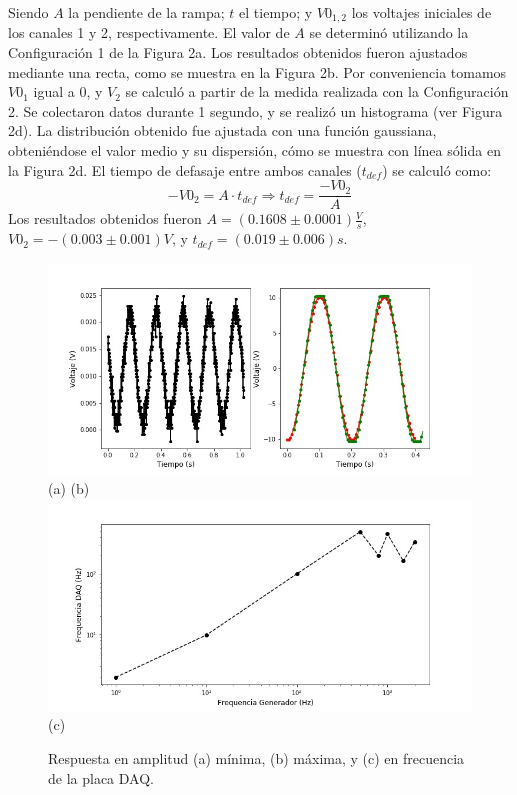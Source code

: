 \documentclass[a4paper,10pt]{article}
\begin{document}
Siendo $A$ la pendiente de la rampa; $t$ el tiempo; y $V0_{1,2}$ los voltajes iniciales de los canales 1 y 2, respectivamente.
El valor de $A$ se determinó utilizando la Configuración 1 de la Figura 2a. Los resultados obtenidos fueron ajustados mediante una recta, como se muestra en la Figura 2b. Por conveniencia tomamos $V0_1$ igual a $0$, y $V_2$ se calculó a partir de la medida realizada con la Configuración 2. Se colectaron datos durante 1 segundo, y se realizó un histograma (ver Figura 2d). La distribución obtenido fue ajustada con una función gaussiana, obteniéndose el valor medio y su dispersión, cómo se muestra con línea sólida en la Figura 2d. El tiempo de defasaje entre ambos canales ($t_{def}$) se calculó como:
\begin{equation*}
    -V0_{2} = A \cdot t_{def} \Rightarrow t_{def} = \frac{- V0_{2}}{A}
\end{equation*}
Los resultados obtenidos fueron $A=(0.1608 \pm 0.0001) \frac{V}{s}$, $V0_2 = -(0.003 \pm 0.001) V$, y $t_{def} = (0.019 \pm 0.006)s$.

\begin{figure}[H]
  \centering
  \includegraphics[width=\textwidth]{DAQ_amplitud.jpg} \\
  (a) \hspace{4cm} (b)
  \includegraphics[trim={0 0 0 1.cm},clip, width=\textwidth]{DAQ_logfrequency.jpg}
  (c)
  \caption{Respuesta en amplitud (a) mínima, (b) máxima, y (c) en frecuencia de la placa DAQ.}
  \label{fig:resp_freq}
\end{figure}
\end{document}
